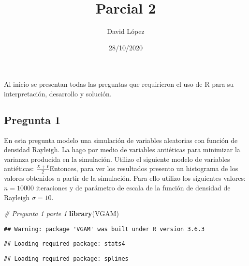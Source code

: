 \documentclass[
]{article}
\title{Parcial 2}
\author{David López}
\date{28/10/2020}
\newenvironment{Shaded}{\begin{snugshade}}{\end{snugshade}}
\newcommand{\CommentTok}[1]{\textcolor[rgb]{0.56,0.35,0.01}{\textit{#1}}}
\newcommand{\KeywordTok}[1]{\textcolor[rgb]{0.13,0.29,0.53}{\textbf{#1}}}
\newcommand{\NormalTok}[1]{#1}
\begin{document}
\maketitle

Al inicio se presentan todas las preguntas que requirieron el uso de R
para su interpretación, desarrollo y solución.

\hypertarget{pregunta-1}{%
\subsection{Pregunta 1}\label{pregunta-1}}

En esta pregunta modelo una simulación de variables aleatorias con
función de densidad Rayleigh. La hago por medio de variables antiéticas
para minimizar la varianza producida en la simulación. Utilizo el
siguiente modelo de variables antiéticas: \(\frac{X+Y}{2}\)Entonces,
para ver los resultados presento un histograma de los valores obtenidos
a partir de la simulación. Para ello utilizo los siguientes valores:
\(n=10000\) iteraciones y de parámetro de escala de la función de
densidad de Rayleigh \(\sigma =10\).

\begin{Shaded}
\begin{Highlighting}[]
\CommentTok{# Pregunta 1 parte 1}
\KeywordTok{library}\NormalTok{(VGAM)}
\end{Highlighting}
\end{Shaded}

\begin{verbatim}
## Warning: package 'VGAM' was built under R version 3.6.3
\end{verbatim}

\begin{verbatim}
## Loading required package: stats4
\end{verbatim}

\begin{verbatim}
## Loading required package: splines
\end{verbatim}
\end{document}
